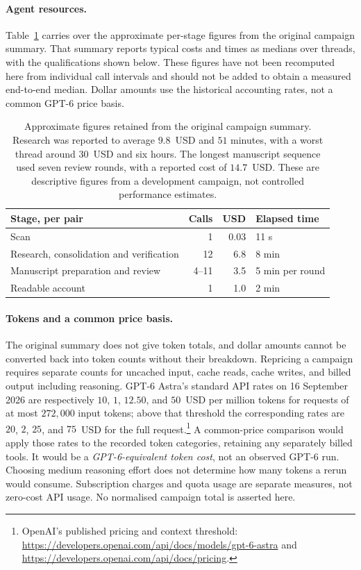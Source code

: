 \documentclass[11pt,a4paper]{article}
\begin{document}
\paragraph{Agent resources.}
Table~\ref{tab:agent-resources} carries over the approximate per-stage figures
from the original campaign summary. That summary reports typical costs and
times as medians over threads, with the qualifications shown below. These
figures have not been recomputed here from individual call intervals and
should not be added to obtain a measured end-to-end median. Dollar amounts
use the historical accounting rates, not a common GPT-6 price basis.

\begin{table}[htbp]
\centering
\small
\begin{tabularx}{\linewidth}{@{}Xrrl@{}}
\toprule
Stage, per pair & Calls & USD & Elapsed time \\
\midrule
Scan & 1 & 0.03 & 11 s \\
Research, consolidation and verification & 12 & 6.8 & 8 min \\
Manuscript preparation and review & 4--11 & 3.5 & 5 min per round \\
Readable account & 1 & 1.0 & 2 min \\
\bottomrule
\end{tabularx}
\caption{Approximate figures retained from the original campaign summary.
Research was reported to average $9.8$~USD and $51$ minutes, with a worst
thread around $30$~USD and six hours. The longest manuscript sequence used
seven review rounds, with a reported cost of $14.7$~USD. These are descriptive
figures from a development campaign, not controlled performance estimates.}
\label{tab:agent-resources}
\end{table}

\paragraph{Tokens and a common price basis.}
The original summary does not give token totals, and dollar amounts cannot
be converted back into token counts without their breakdown. Repricing a
campaign requires separate counts for uncached input, cache reads, cache
writes, and billed output including reasoning. GPT-6 Astra's standard API
rates on 16 September 2026 are respectively $10$, $1$, $12.50$, and $50$~USD
per million tokens for requests of at most $272{,}000$ input tokens; above
that threshold the corresponding rates are $20$, $2$, $25$, and $75$~USD for
the full request.\footnote{OpenAI's published pricing and context threshold:
\url{https://developers.openai.com/api/docs/models/gpt-6-astra} and
\url{https://developers.openai.com/api/docs/pricing}.}
A common-price comparison would apply those rates to the recorded token
categories, retaining any separately billed tools. It would be a
\emph{GPT-6-equivalent token cost}, not an observed GPT-6 run. Choosing medium
reasoning effort does not determine how many tokens a rerun would consume.
Subscription charges and quota usage are separate measures, not zero-cost API
usage. No normalised campaign total is asserted here.
\end{document}
